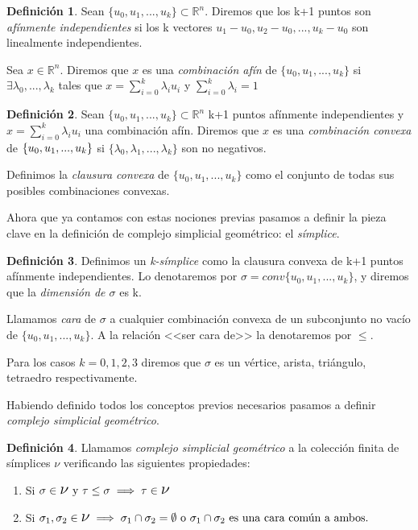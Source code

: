 \documentclass[12pt, a4paper, twoside]{book}
\numberwithin{equation}{section}
\theoremstyle{definition}
\newtheorem{defi}{Definición}
\theoremstyle{remark}
\theoremstyle{plain}
\begin{document}
	\begin{defi}
		Sean $\{u_{0},u_{1},...,u_{k}\}\subset\mathbb{R}^{n}$. Diremos
		que los k+1 puntos son \textit{afínmente independientes} si 
		los k vectores $u_{1}-u_{0},u_{2}-u_{0},...,u_{k}-u_{0}$ son
		linealmente independientes.

		Sea $x \in \mathbb{R}^{n}$. Diremos que $x$ es una 
		\textit{combinación afín} de $\{u_{0},u_{1},...,u_{k}\}$ si 
		$\exists \lambda_{0},...,\lambda_{k}$ tales que 
		$x=\sum_{i=0}^{k}\lambda_{i}u_{i}$ y 
		$\sum_{i=0}^{k}\lambda_{i}=1$
	\end{defi}

	\begin{defi}
		Sean $\{u_{0},u_{1},...,u_{k}\}\subset\mathbb{R}^{n}$ k+1 
		puntos afínmente independientes y $x=\sum_{i=0}^{k}
		\lambda_{i}u_{i}$ una combinación afín. Diremos que $x$ es una
		\textit{combinación convexa} de $\{u_{0},u_{1},...,\\
		u_{k}\}$ si $\{\lambda_{0},\lambda_{1},...,\lambda_{k}\}$ son 
		no negativos.

		Definimos la \textit{clausura convexa} de $\{u_{0},u_{1},...,
		u_{k}\}$ como el conjunto de todas sus posibles combinaciones 
		convexas.
	\end{defi}

	Ahora que ya contamos con estas nociones previas pasamos a definir la 
	pieza clave en la definición de complejo simplicial geométrico: el 
	\emph{símplice}.

	\begin{defi}
		Definimos un \textit{k-símplice} como la clausura convexa de 
		k+1 puntos afínmente independientes. Lo denotaremos por 
		$\sigma=conv\{u_{0},u_{1},...,u_{k}\}$, y diremos que la 
		\textit{dimensión de $\sigma$} es k.

		Llamamos \textit{cara} de $\sigma$ a cualquier combinación 
		convexa de un subconjunto no vacío de $\{u_{0},u_{1},...,
		u_{k}\}$. A la relación <<ser cara de>> la denotaremos por 
		$\leq$.

		Para los casos $k=0,1,2,3$ diremos que $\sigma$ es un vértice,
		arista, triángulo, tetraedro respectivamente.
	\end{defi}

	Habiendo definido todos los conceptos previos necesarios pasamos a 
	definir \emph{complejo simplicial geométrico}.

	\begin{defi}
		Llamamos \textit{complejo simplicial geométrico} a la 
		colección finita de símplices {\Large $\nu$} verificando las
		siguientes propiedades:
		\begin{enumerate}
			\item Si $\sigma\in \text{{\Large $\nu$} y }
				\tau \leq \sigma \implies \tau \in 
				\text{{\Large $\nu$}}$
			\item Si $\sigma_{1},\sigma_{2} \in 
				\text{{\Large $\nu$}} \implies 
				\sigma_{1}\cap\sigma_{2}=\emptyset \text{ o }
				\sigma_{1}\cap\sigma_{2} \text{ es una cara 
				común a ambos.}$
		\end{enumerate}
	\end{defi}
	
\end{document}
